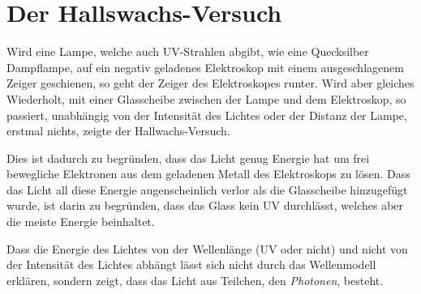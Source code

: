 \documentclass{article}
\begin{document}
\section{Der Hallswachs-Versuch} 
Wird eine Lampe, welche auch UV-Strahlen abgibt, wie eine Quecksilber Dampflampe, auf ein negativ geladenes Elektroskop mit einem ausgeschlagenem Zeiger geschienen, so geht der Zeiger des Elektroskopes runter. Wird aber gleiches Wiederholt, mit einer Glasscheibe zwischen der Lampe und dem Elektroskop, so passiert, unabhängig von der Intensität des Lichtes oder der Distanz der Lampe, erstmal nichts, zeigte der Hallwachs-Versuch.
 
Dies ist dadurch zu begründen, dass das Licht genug Energie hat um frei bewegliche Elektronen aus dem geladenen Metall des Elektroskops zu lösen. Dass das Licht all diese Energie augenscheinlich verlor als die Glasscheibe hinzugefügt wurde, ist darin zu begründen, dass das Glass kein UV durchlässt, welches aber die meiste Energie beinhaltet.
 
Dass die Energie des Lichtes von der Wellenlänge (UV oder nicht) und nicht von der Intensität des Lichtes abhängt lässt sich nicht durch das Wellenmodell erklären, sondern zeigt, dass das Licht aus Teilchen, den \emph{Photonen}, besteht.
\end{document}
